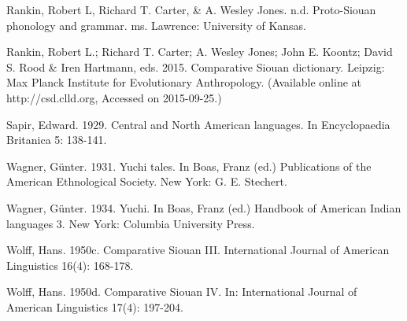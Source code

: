 \documentclass[output=paper]{LSP/langsci}
\begin{document}
Rankin, Robert L, Richard T. Carter, \& A. Wesley Jones. n.d. Proto-Siouan phonology and grammar. ms. Lawrence: University of Kansas.



Rankin, Robert L.; Richard T. Carter; A. Wesley Jones; John E. Koontz; David S. Rood \& Iren Hartmann, eds. 2015. Comparative Siouan dictionary. Leipzig: Max Planck Institute for Evolutionary Anthropology. (Available online at http://csd.clld.org, Accessed on 2015-09-25.)

 


Sapir, Edward. 1929. Central and North American languages. In Encyclopaedia Britanica 5: 138-141.



 
 

 

Wagner, Günter. 1931. Yuchi tales. In Boas, Franz (ed.) Publications of the American Ethnological Society. New York: G. E. Stechert.



Wagner, Günter. 1934. Yuchi. In Boas, Franz (ed.) Handbook of American Indian languages 3.  New York: Columbia University Press.

 


Wolff, Hans. 1950c. Comparative Siouan III. International Journal of American Linguistics 16(4): 168-178.



Wolff, Hans. 1950d. Comparative Siouan IV. In: International Journal of American Linguistics 17(4): 197-204.
\end{document}
